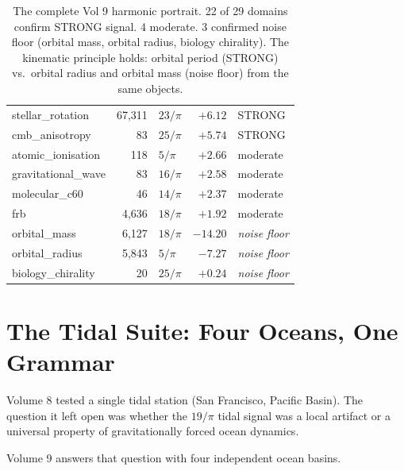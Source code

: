 \documentclass[11pt, letterpaper, openany]{book}
\begin{document}
\begin{table}[H]
\begin{tabular}{|l|r|l|r|l|}
stellar\_rotation    & 67,311    & $23/\pi$ & $+6.12$   & STRONG \\
cmb\_anisotropy      & 83        & $25/\pi$ & $+5.74$   & STRONG \\
\hline
atomic\_ionisation   & 118       & $5/\pi$  & $+2.66$   & moderate \\
gravitational\_wave  & 83        & $16/\pi$ & $+2.58$   & moderate \\
molecular\_c60       & 46        & $14/\pi$ & $+2.37$   & moderate \\
frb                  & 4,636     & $18/\pi$ & $+1.92$   & moderate \\
\hline
\rowcolor{gray!10}
orbital\_mass        & 6,127     & $18/\pi$ & $-14.20$  & \textit{noise floor} \\
\rowcolor{gray!10}
orbital\_radius      & 5,843     & $5/\pi$  & $-7.27$   & \textit{noise floor} \\
\rowcolor{gray!10}
biology\_chirality   & 20        & $25/\pi$ & $+0.24$   & \textit{noise floor} \\
\hline
\end{tabular}
\caption{The complete Vol 9 harmonic portrait. 22 of 29 domains confirm STRONG
signal. 4 moderate. 3 confirmed noise floor (orbital mass, orbital radius,
biology chirality). The kinematic principle holds: orbital period (STRONG)
vs.\ orbital radius and orbital mass (noise floor) from the same objects.}
\label{tab:v9_full_portrait}
\end{table}

\section{The Tidal Suite: Four Oceans, One Grammar}

Volume 8 tested a single tidal station (San Francisco, Pacific Basin). The question
it left open was whether the $19/\pi$ tidal signal was a local artifact or a
universal property of gravitationally forced ocean dynamics.

Volume 9 answers that question with four independent ocean basins.
\end{document}
